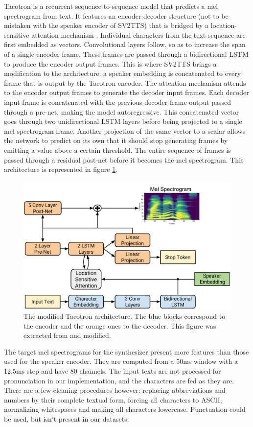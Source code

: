 \documentclass[a4paper, oneside, 12pt, english]{article}
\begin{document}
Tacotron is a recurrent sequence-to-sequence model that predicts a mel spectrogram from text. It features an encoder-decoder structure (not to be mistaken with the speaker encoder of SV2TTS) that is bridged by a location-sensitive attention mechanism \citep{Attention2}. Individual characters from the text sequence are first embedded as vectors. Convolutional layers follow, so as to increase the span of a single encoder frame. These frames are passed through a bidirectional LSTM to produce the encoder output frames. This is where SV2TTS brings a modification to the architecture: a speaker embedding is concatenated to every frame that is output by the Tacotron encoder. The attention mechanism attends to the encoder output frames to generate the decoder input frames. Each decoder input frame is concatenated with the previous decoder frame output passed through a pre-net, making the model autoregressive. This concatenated vector goes through two unidirectional LSTM layers before being projected to a single mel spectrogram frame. Another projection of the same vector to a scalar allows the network to predict on its own that it should stop generating frames by emitting a value above a certain threshold. The entire sequence of frames is passed through a residual post-net before it becomes the mel spectrogram. This architecture is represented in figure \ref{tacotron2_arch}.

\begin{figure}[h]
	\centering
	\includegraphics[width=0.7\linewidth]{images/tacotron2_arch.png}
	\caption{The modified Tacotron architecture. The blue blocks correspond to the encoder and the orange ones to the decoder. This figure was extracted from \citep{Tacotron2} and modified.}
	\label{tacotron2_arch}
\end{figure}

The target mel spectrograms for the synthesizer present more features than those used for the speaker encoder. They are computed from a 50ms window with a 12.5ms step and have 80 channels. The input texts are not processed for pronunciation in our implementation, and the characters are fed as they are. There are a few cleaning procedures however: replacing abbreviations and numbers by their complete textual form, forcing all characters to ASCII, normalizing whitespaces and making all characters lowercase. Punctuation could be used, but isn't present in our datasets.
\end{document}
